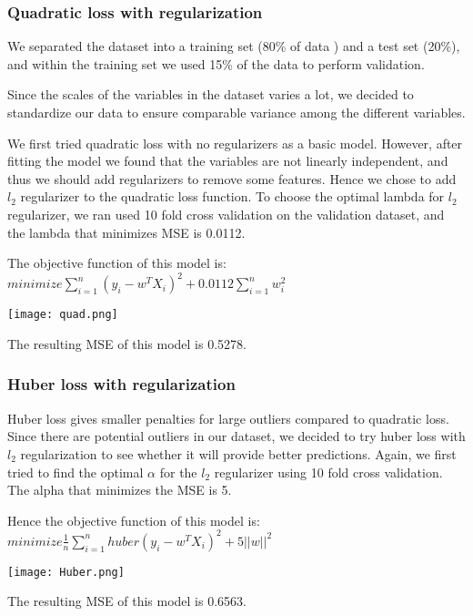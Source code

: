\documentclass[12pt]{article}
\begin{document}
\subsubsection{Quadratic loss with regularization}
We separated the dataset into a training set (80\% of data ) and a test set (20\%), and within the training set we used 15\% of the data to perform validation. \par
Since the scales of the variables in the dataset varies a lot, we decided to standardize our data to ensure comparable variance among the different variables. \par
We first tried quadratic loss with no regularizers as a basic model. However, after fitting the model we found that the variables are not linearly independent, and thus we should add regularizers to remove some features. Hence we chose to add $l_{2}$ regularizer to the quadratic loss function. To choose the optimal lambda for $l_{2}$ regularizer, we ran used 10 fold cross validation on the validation dataset, and the lambda that minimizes MSE is 0.0112. 
\par The objective function of this model is: $minimize \sum_{i=1}^{n} (y_{i} - w^{T}X_{i})^{2} + 0.0112\sum_{i=1}^{n} w_{i}^{2}$
\begin{center}
\texttt{[image: quad.png]}\\
\end{center}
\par The resulting MSE of this model is 0.5278.

\subsubsection{Huber loss with regularization}
Huber loss gives smaller penalties for large outliers compared to quadratic loss. Since there are potential outliers in our dataset, we decided to try huber loss with $l_{2}$ regularization to see whether it will provide better predictions. Again, we first tried to find the optimal $\alpha$ for the $l_{2}$ regularizer using 10 fold cross validation. The alpha that minimizes the MSE is 5. 
 \par Hence the objective function of this model is: $minimize \frac{1}{n}\sum_{i=1}^{n} huber(y_{i} - w^{T}X_{i})^{2} + 5 ||w||^{2}$
\begin{center}
\texttt{[image: Huber.png]}\\
\end{center}
\par The resulting MSE of this model is 0.6563.
\end{document}
